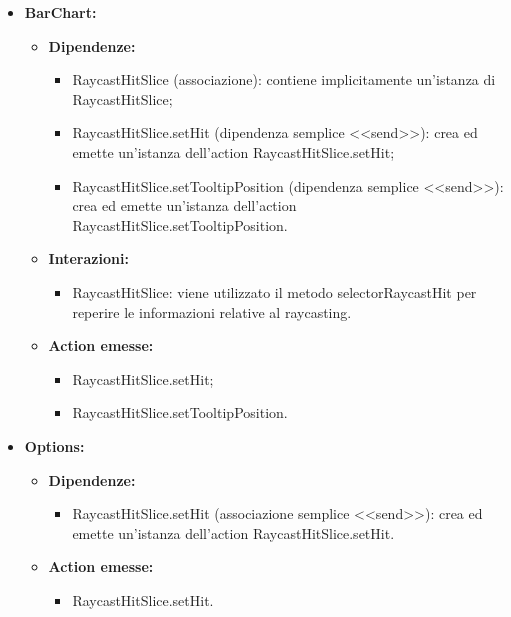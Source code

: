\begin{itemize}
      \item \textbf{BarChart:}
            \begin{itemize}
                  \item \textbf{Dipendenze:}
                        \begin{itemize}
                              \item RaycastHitSlice (associazione): contiene implicitamente un'istanza di
                                    RaycastHitSlice;
                              \item RaycastHitSlice.setHit (dipendenza semplice <<send>>): crea ed emette
                                    un'istanza dell'action RaycastHitSlice.setHit;
                              \item RaycastHitSlice.setTooltipPosition (dipendenza semplice <<send>>): crea ed
                                    emette un'istanza dell'action RaycastHitSlice.setTooltipPosition.
                        \end{itemize}
                  \item \textbf{Interazioni:}
                        \begin{itemize}
                              \item RaycastHitSlice: viene utilizzato il metodo selectorRaycastHit per reperire le
                                    informazioni relative al raycasting.
                        \end{itemize}
                  \item \textbf{Action emesse:}
                        \begin{itemize}
                              \item RaycastHitSlice.setHit;
                              \item RaycastHitSlice.setTooltipPosition.
                        \end{itemize}
            \end{itemize}

      \item \textbf{Options:}
            \begin{itemize}
                  \item \textbf{Dipendenze:}
                        \begin{itemize}
                              \item RaycastHitSlice.setHit (associazione semplice <<send>>): crea ed
                                    emette un'istanza dell'action RaycastHitSlice.setHit.
                        \end{itemize}
                  \item \textbf{Action emesse:}
                        \begin{itemize}
                              \item RaycastHitSlice.setHit.
                        \end{itemize}
            \end{itemize}


\end{itemize}
